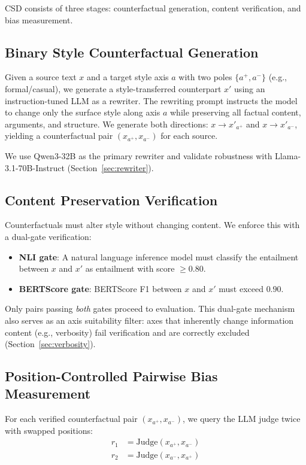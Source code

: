 \documentclass[11pt,a4paper]{article}
\begin{document}
CSD consists of three stages: counterfactual generation, content verification, and bias measurement.

\subsection{Binary Style Counterfactual Generation}
\label{sec:counterfactual}

Given a source text $x$ and a target style axis $a$ with two poles $\{a^+, a^-\}$ (e.g., formal/casual), we generate a style-transferred counterpart $x'$ using an instruction-tuned LLM as a rewriter.
The rewriting prompt instructs the model to change only the surface style along axis $a$ while preserving all factual content, arguments, and structure.
We generate both directions: $x \rightarrow x'_{a^+}$ and $x \rightarrow x'_{a^-}$, yielding a counterfactual pair $(x_{a^+}, x_{a^-})$ for each source.

We use Qwen3-32B as the primary rewriter and validate robustness with Llama-3.1-70B-Instruct (Section~\ref{sec:rewriter}).

\subsection{Content Preservation Verification}
\label{sec:verification}

Counterfactuals must alter style without changing content.
We enforce this with a dual-gate verification:
\begin{itemize}
    \item \textbf{NLI gate}: A natural language inference model must classify the entailment between $x$ and $x'$ as entailment with score $\geq 0.80$.
    \item \textbf{BERTScore gate}: BERTScore F1 between $x$ and $x'$ must exceed $0.90$.
\end{itemize}

Only pairs passing \emph{both} gates proceed to evaluation.
This dual-gate mechanism also serves as an axis suitability filter: axes that inherently change information content (e.g., verbosity) fail verification and are correctly excluded (Section~\ref{sec:verbosity}).

\subsection{Position-Controlled Pairwise Bias Measurement}
\label{sec:measurement}

For each verified counterfactual pair $(x_{a^+}, x_{a^-})$, we query the LLM judge twice with swapped positions:
\begin{align}
    r_1 &= \text{Judge}(x_{a^+}, x_{a^-}) \\
    r_2 &= \text{Judge}(x_{a^-}, x_{a^+})
\end{align}
\end{document}
